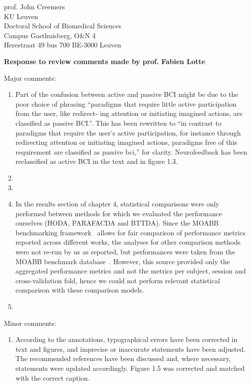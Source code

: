 \documentclass{letter}
\newcommand{\reply}[1]{%
	\textbf{Response to review comments made by prof. #1}

}
\begin{document}
\begin{letter}{
	prof. John Creemers \\
	KU Leuven \\
	Doctoral School of Biomedical Sciences \\
	Campus Gasthuisberg, O\&N 4 \\
	Herestraat 49 bus 700
	BE-3000 Leuven

}
\reply{Fabien Lotte}
Major comments:
\begin{enumerate}
	\item Part of the confusion between active and passive BCI might be due
	to the poor choice of phrasing ``paradigms that require little active participation from the user, like redirect-
	ing attention or initiating imagined actions, are classified as passive BCI.''.
	This has been rewritten to ``in contrast to paradigms that require the user's active participation, for
	instance through redirecting attention or initiating imagined actions,
	paradigms free of this requirement are classified as passive bci,''
	for clarity.
	Neurofeedback has been reclassified as active BCI in the text and in
	figure 1.3.
	\item {}
	\item {}
	\item In the results section of chapter 4, statistical comparisons were
	only performed between methods for which we evaluated the performance
	ourselves (HODA, PARAFACDA and BTTDA).
	Since the MOABB benchmarking framework~\cite{Aristimunha2023} allows for
	fair comparison of performance metrics reported across different works,
	the analyses for other comparison methods were not re-run
	by us as reported, but performances were
	taken from the MOABB benchmark database~\cite{Chevallier2024}.
	However, this source provided only the aggregated performance metrics
	and not the metrics per subject, session and cross-validation fold,
	hence we could not perform relevant statistical comparison with these
	comparison models.
	\item {}
\end{enumerate}
Minor comments:
\begin{enumerate}
	\item According to the annotations, typographical errors have been
	corrected in text and figures, and imprecise or inaccurate statements have been adjusted.
	The recommended references have been discussed and, where necessary,
	statements were updated accordingly.
  Figure 1.5 was corrected and matched with the correct caption.
\end{enumerate}


\end{letter}
\end{document}
